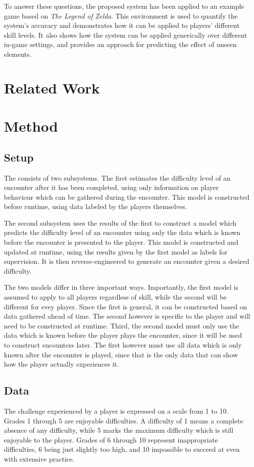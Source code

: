 \documentclass[a4paper]{article}
\begin{document}
\begin{multicols*}{2}
To answer these questions, the proposed system has been applied to an example game based on \emph{The Legend of Zelda}. This environment is used to quantify the system's accuracy and demonstrates how it can be applied to players' different skill levels. It also shows how the system can be applied generically over different in-game settings, and provides an approach for predicting the effect of unseen elements.

\section{Related Work}

\section{Method}
\subsection{Setup}
The consists of two subsystems. The first estimates the difficulty level of an encounter after it has been completed, using only information on player behaviour which can be gathered during the encounter. This model is constructed before runtime, using data labeled by the players themselves.

The second subsystem uses the results of the first to construct a model which predicts the difficulty level of an encounter using only the data which is known before the encounter is presented to the player. This model is constructed and updated at runtime, using the results given by the first model as labels for supervision. It is then reverse-engineered to generate an encounter given a desired difficulty.

The two models differ in three important ways. Importantly, the first model is assumed to apply to all players regardless of skill, while the second will be different for evey player. Since the first is general, it can be constructed based on data gathered ahead of time. The second however is specific to the player and will need to be constructed at runtime. Third, the second model must only use the data which is known before the player plays the encounter, since it will be used to construct encounters later. The first however must use all data which is only known after the encounter is played, since that is the only data that can show how the player actually experiences it.

\subsection{Data}
The challenge experienced by a player is expressed on a scale from 1 to 10. Grades 1 through 5 are enjoyable difficulties. A difficulty of 1 means a complete absence of any difficulty, while 5 marks the maximum difficulty which is still enjoyable to the player. Grades of 6 through 10 represent inappropriate difficulties, 6 being just slightly too high, and 10 impossible to succeed at even with extensive practice.


\end{multicols*}
\end{document}

